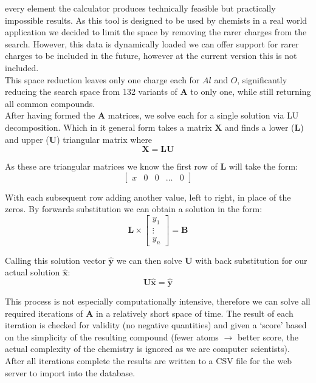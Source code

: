 every element the calculator produces technically feasible but practically impossible results. As this tool is designed to be used by chemists in a real world application we decided to limit the space by removing the rarer charges from the search. However, this data is dynamically loaded we can offer support for rarer charges to be included in the future, however at the current version this is not included. \\

This space reduction leaves only one charge each for $Al$ and $O$, significantly reducing the search space from 132 variants of $\mathbf{A}$ to only one, while still returning all common compounds. \\ 

After having formed the $\mathbf{A}$ matrices, we solve each for a single solution via LU decomposition. Which in it general form takes a matrix $\mathbf{X}$ and finds a lower ($\mathbf{L}$) and upper ($\mathbf{U}$) triangular matrix where 
\begin{equation*}
\mathbf{X} = \mathbf{L}\mathbf{U}
\end{equation*}

As these are triangular matrices we know the first row of $\mathbf{L}$ will take the form:
\begin{equation*}
\begin{bmatrix}
x & 0 & 0 & \dots & 0
\end{bmatrix}
\end{equation*}

With each subsequent row adding another value, left to right, in place of the zeros. By forwards substitution we can obtain a solution in the form:\\
\begin{equation*}
\mathbf{L} \times 
\begin{bmatrix}
y_1 \\
\vdots \\
y_n
\end{bmatrix}
=
\mathbf{B}
\end{equation*}
\vspace{0em}

Calling this solution vector $\mathbf{\hat{y}}$ we can then solve $\mathbf{U}$ with back substitution for our actual solution $\mathbf{\hat{x}}$:
\begin{equation*}
\mathbf{U}\mathbf{\hat{x}} = \mathbf{\hat{y}}
\end{equation*}

This process is not especially computationally intensive, therefore we can solve all required iterations of $\mathbf{A}$ in a relatively short space of time. The result of each iteration is checked for validity (no negative quantities) and given a `score' based on the simplicity of the resulting compound (fewer atoms $\rightarrow$ better score, the actual complexity of the chemistry is ignored as we are computer scientists). After all iterations complete the results are written to a CSV file for the web server to import into the database.

